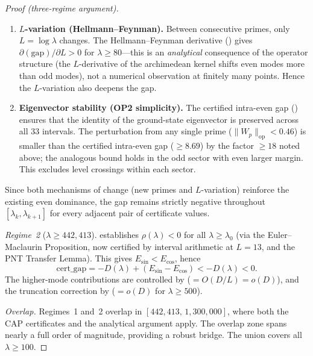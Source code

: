 \documentclass[12pt,a4paper]{article}
\theoremstyle{definition}
\theoremstyle{remark}
\begin{document}
\begin{proof}[Proof (three-regime argument)]
\begin{enumerate}[label=(\roman*)]
  \item \textbf{$L$-variation (Hellmann--Feynman).}
    Between consecutive primes, only $L = \log\lambda$ changes.
    The Hellmann--Feynman derivative () gives $\partial(\mathrm{gap})/\partial L > 0$ for $\lambda \geq 80$---this is an \emph{analytical} consequence of the operator structure (the $L$-derivative of the archimedean kernel shifts even modes more than odd modes), not a numerical observation at finitely many points.
    Hence the $L$-variation also deepens the gap.

  \item \textbf{Eigenvector stability (OP2 simplicity).}
    The certified intra-even gap () ensures that the identity of the ground-state eigenvector is preserved across all $33$ intervals.
    The perturbation from any single prime ($\|W_p\|_{\mathrm{op}} < 0.46$) is smaller than the certified intra-even gap ($\geq 8.69$) by the factor $\geq 18$ noted above; the analogous bound holds in the odd sector with even larger margin.
    This excludes level crossings within each sector.
\end{enumerate}

\noindent Since both mechanisms of change (new primes and $L$-variation) reinforce the existing even dominance, the gap remains strictly negative throughout $[\lambda_k, \lambda_{k+1}]$ for every adjacent pair of certificate values.

\emph{Regime~2} ($\lambda \geq 442{,}413$).  establishes $\rho(\lambda) < 0$ for all $\lambda \geq \lambda_0$ (via the Euler--Maclaurin Proposition, now certified by interval arithmetic at $L = 13$, and the PNT Transfer Lemma). This gives $E_{\sin} < E_{\cos}$, hence
\[
  \mathrm{cert\_gap} = -D(\lambda) + (E_{\sin} - E_{\cos}) < -D(\lambda) < 0.
\]
The higher-mode contributions are controlled by  ($= O(D/L) = o(D)$), and the truncation correction by  ($= o(D)$ for $\lambda \geq 500$).

\emph{Overlap.} Regimes~1 and~2 overlap in $[442{,}413,\, 1{,}300{,}000]$, where both the CAP certificates and the analytical argument apply. The overlap zone spans nearly a full order of magnitude, providing a robust bridge. The union covers all $\lambda \geq 100$.
\end{proof}
\end{document}
